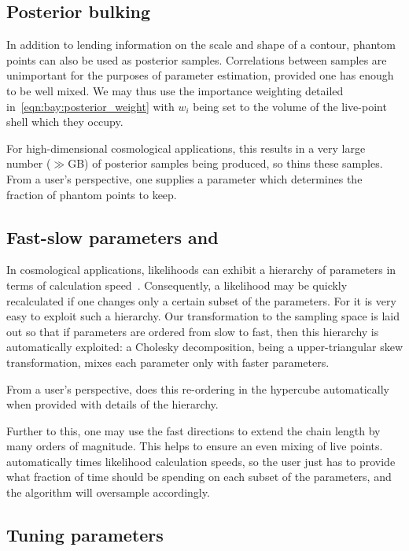 \subsection{Posterior bulking}
\label{sec:pc:posterior_bulking}
In addition to lending information on the scale and shape of a contour, phantom points can also be used as posterior samples. Correlations between samples are unimportant for the purposes of parameter estimation, provided one has enough to be well mixed. We may thus use the importance weighting detailed in~\eqref{eqn:bay:posterior_weight} with \(w_i\) being set to the volume of the live-point shell which they occupy.

For high-dimensional cosmological applications, this results in a very large number (\(\gg\)GB) of posterior samples being produced, so \PolyChord{} thins these samples. From a user's perspective, one supplies a parameter which determines the fraction of phantom points to keep.

\subsection{Fast-slow parameters and \CosmoChord}
\label{sec:pc:fast_slow}

In cosmological applications, likelihoods can exhibit a hierarchy of parameters in terms of calculation speed~\citep{LewisFastSlow}. Consequently, a likelihood may be quickly recalculated if one changes only a certain subset of the parameters. For \PolyChord{} it is very easy to exploit such a hierarchy. Our transformation to the sampling space is laid out so that if parameters are ordered from slow to fast, then this hierarchy is automatically exploited: a Cholesky decomposition, being a upper-triangular skew transformation, mixes each parameter only with faster parameters.

From a user's perspective, \PolyChord{} does this re-ordering in the hypercube automatically when provided with details of the hierarchy.

Further to this, one may use the fast directions to extend the chain length by many orders of magnitude. This helps to ensure an even mixing of live points. \PolyChord{} automatically times likelihood calculation speeds, so the user just has to provide what fraction of time \PolyChord{} should be spending on each subset of the parameters, and the algorithm will oversample accordingly.

\subsection{Tuning parameters}
\label{sec:pc:tuning_params}

